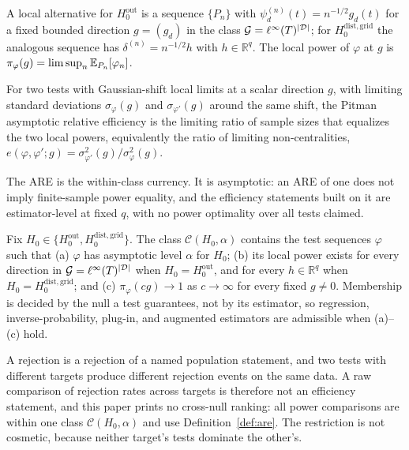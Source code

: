 \begin{definition}
\label{def:localpower}
A local alternative for $H_0^{\mathrm{out}}$ is a sequence $\{P_n\}$ with $\psi_d^{(n)}(t)=n^{-1/2}g_d(t)$ for a fixed bounded direction $g=(g_d)$ in the class $\mathcal G=\ell^\infty(T)^{\lvert \mathcal D\rvert}$; for $H_0^{\mathrm{dist,grid}}$ the analogous sequence has $\delta^{(n)}=n^{-1/2}h$ with $h\in\mathbb R^q$. The local power of $\varphi$ at $g$ is $\pi_\varphi(g)=\limsup_n\mathbb{E}_{P_n}[\varphi_n]$.
\end{definition}

\begin{definition}
\label{def:are}
For two tests with Gaussian-shift local limits at a scalar direction $g$, with limiting standard deviations $\sigma_\varphi(g)$ and $\sigma_{\varphi'}(g)$ around the same shift, the Pitman asymptotic relative efficiency is the limiting ratio of sample sizes that equalizes the two local powers, equivalently the ratio of limiting non-centralities, $e(\varphi,\varphi';g)=\sigma^2_{\varphi'}(g)/\sigma^2_\varphi(g)$.
\end{definition}

The ARE is the within-class currency. It is asymptotic: an ARE of one does not imply finite-sample power equality, and the efficiency statements built on it are estimator-level at fixed $q$, with no power optimality over all tests claimed.

\begin{definition}
\label{def:class}
Fix $H_0\in\{H_0^{\mathrm{out}},H_0^{\mathrm{dist,grid}}\}$. The class $\mathcal C(H_0,\alpha)$ contains the test sequences $\varphi$ such that (a) $\varphi$ has asymptotic level $\alpha$ for $H_0$; (b) its local power exists for every direction in $\mathcal G=\ell^\infty(T)^{\lvert \mathcal D\rvert}$ when $H_0=H_0^{\mathrm{out}}$, and for every $h\in\mathbb R^q$ when $H_0=H_0^{\mathrm{dist,grid}}$; and (c) $\pi_\varphi(cg)\to1$ as $c\to\infty$ for every fixed $g\ne0$. Membership is decided by the null a test guarantees, not by its estimator, so regression, inverse-probability, plug-in, and augmented estimators are admissible when (a)--(c) hold.
\end{definition}

A rejection is a rejection of a named population statement, and two tests with different targets produce different rejection events on the same data. A raw comparison of rejection rates across targets is therefore not an efficiency statement, and this paper prints no cross-null ranking: all power comparisons are within one class $\mathcal C(H_0,\alpha)$ and use Definition~\ref{def:are}. The restriction is not cosmetic, because neither target's tests dominate the other's.

